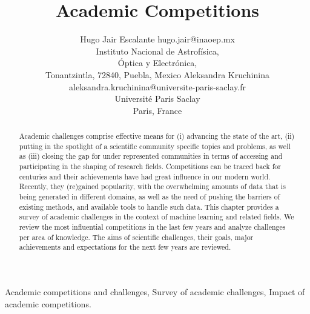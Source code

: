 \documentclass[twoside,11pt]{article}
\begin{document}
\title{Academic Competitions}

\author{\name Hugo Jair Escalante \email hugo.jair@inaoep.mx \\
       \addr Instituto Nacional de Astrof\'isica,\\ \'Optica y Electr\'onica,\\ 
       Tonantzintla, 72840, Puebla, Mexico 
       \AND
       \name Aleksandra Kruchinina \email aleksandra.kruchinina@universite-paris-saclay.fr \\
       \addr Universit\'e Paris Saclay\\
       Paris, France}

\editor{}

\maketitle

\begin{abstract}%
Academic challenges comprise effective means for (i) advancing the state of the art, (ii) putting in the spotlight of a scientific community specific topics and problems, as well as (iii) closing the gap for under represented communities in terms of accessing and participating in the shaping of research fields.   Competitions can be traced back for centuries and their achievements have had great influence in our modern world. Recently,  they (re)gained popularity, with the overwhelming amounts of data that is being generated in different domains, as well as the need of pushing the barriers of existing methods, and available tools to handle such data.
This chapter provides a survey of academic challenges in the context of machine learning and related fields.  We review the most influential competitions in the last few years and analyze  challenges per area of knowledge. The aims of scientific challenges, their goals, major achievements and expectations for the next few years are reviewed.
\end{abstract}

\begin{keywords}
Academic competitions and challenges, Survey of academic challenges, Impact of academic competitions.
\end{keywords}
\end{document}
